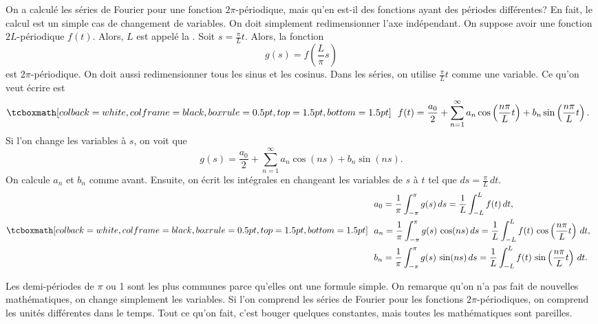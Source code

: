 On a calculé les séries de Fourier pour une fonction $2\pi$-périodique, mais qu'en est-il des fonctions ayant des périodes différentes? En fait, le calcul est un simple cas de changement de variables. On doit simplement  redimensionner l'axe indépendant. On suppose avoir une fonction  $2L$-périodique $f(t)$.  Alors, $L$ est appelé la  \emph{}.  Soit $s = \frac{\pi}{L}  t$.
Alors, la fonction
\begin{equation*}
g(s) = f\left(\frac{L}{\pi} s \right)
\end{equation*}
est $2\pi$-périodique.  On doit aussi redimensionner tous les sinus et les cosinus. Dans les séries, on utilise $\frac{\pi}{L} t$ comme une variable. Ce qu'on veut écrire est
\begin{equation*}
\mybxbg{~~
f(t) = 
\frac{a_0}{2} +
\sum_{n=1}^\infty a_n \cos \left( \frac{n \pi}{L} t \right)
+ b_n \sin \left(\frac{n \pi}{L} t \right) .
~~}
\end{equation*}
Si l'on change les variables à $s$, on voit que 
\begin{equation*}
g(s) = 
\frac{a_0}{2} +
\sum_{n=1}^\infty a_n \cos (n s)
+ b_n \sin (n s) .
\end{equation*}
On calcule $a_n$ et $b_n$ comme avant.  Ensuite, on écrit les intégrales en changeant les variables de $s$ à $t$ tel que $ds = \frac{\pi}{L} \, dt$.
\begin{equation*}
\mybxbg{~~
\begin{aligned}
& a_0 =
\frac{1}{\pi}
\int_{-\pi}^\pi
g(s) \, ds
=
\frac{1}{L}
\int_{-L}^L
f(t) \, dt , \\
& a_n =
\frac{1}{\pi}
\int_{-\pi}^\pi
g(s) \, \cos (n s) \, ds
=
\frac{1}{L}
\int_{-L}^L
f(t) \, \cos \left( \frac{n \pi}{L} t \right) \, dt , \\
& b_n =
\frac{1}{\pi}
\int_{-\pi}^\pi
g(s) \, \sin (n s) \, ds
=
\frac{1}{L}
\int_{-L}^L
f(t) \, \sin \left( \frac{n \pi}{L} t \right) \, dt .
\end{aligned}
~~}
\end{equation*}

Les demi-périodes de $\pi$ ou 1 sont les plus communes parce qu'elles ont une formule simple. On remarque qu'on n'a pas fait de nouvelles mathématiques, on change simplement les variables. Si l'on comprend les séries de Fourier pour les fonctions  $2\pi$-périodiques, on comprend les unités différentes dans le temps. Tout ce qu'on fait, c'est bouger quelques constantes, mais toutes les mathématiques sont pareilles.

